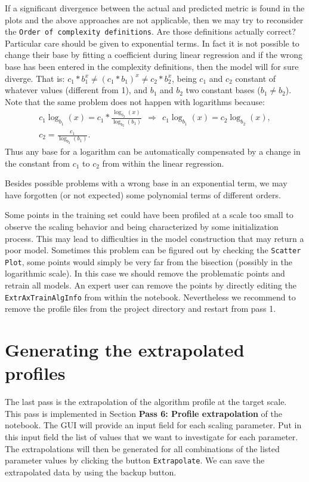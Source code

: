 \documentclass[a4paper, 10pt]{article}
\begin{document}
If a significant divergence between the actual and predicted metric is found in the plots and the above approaches are not applicable,
then we may try to reconsider the \texttt{Order of complexity definitions}. Are those definitions
actually correct? Particular care should be given to
exponential terms. In fact it is not possible to change their base by fitting a coefficient during linear regression and if the wrong base
has been entered in the complexity definitions, then the model will for sure diverge. That is: $c_1*b_1^{x} \neq (c_1*b_1)^{x} \neq c_2*b_2^{x}$, being $c_1$
and $c_2$ constant of whatever values (different from 1), and $b_1$ and $b_2$ two constant bases ($b_1\neq b_2$). Note that the same problem
does not happen with logarithms because:
\begin{eqnarray}
 c_1\log_{b_1}(x) = c_1 * \frac{\log_{b_2}(x)}{\log_{b_2}(b_1)}~~\Rightarrow~~ c_1\log_{b_1}(x) = c_2\log_{b_2}(x), \\
 c_2 = \frac{c_1}{\log_{b_2}(b_1)}.
\end{eqnarray}
Thus any base for a logarithm can be automatically compensated by a change in the constant from $c_1$ to $c_2$ from within the linear regression.

Besides possible problems with a wrong base in an exponential term, we may have forgotten (or not expected)
some polynomial terms of different orders.

Some points in the training set could have been profiled at a scale too small to observe the scaling behavior and being characterized by
some initialization process. This may lead to difficulties in the model construction that may return a poor model.
Sometimes this problem can be figured out by checking the \texttt{Scatter Plot}, some points would simply be very far from the bisection (possibly
in the logarithmic scale). In this case we should remove the problematic points and retrain all models. An expert user can remove
the points by directly editing the \texttt{ExtrAxTrainAlgInfo} from within the \ex notebook. Nevertheless we recommend to remove the profile files
from the \ex project directory and restart from pass 1.

\section{Generating the extrapolated profiles}
\label{sec:output}

The last \ex pass is the extrapolation of the algorithm profile at the target scale. This pass is implemented in Section
\textbf{Pass 6: Profile extrapolation} of the \ex notebook.
The GUI will provide an input field for each scaling parameter. Put in this input field the list of values that we want
to investigate for each parameter. The extrapolations will then be generated for all combinations
of the listed parameter values by clicking the button \texttt{Extrapolate}.
We can save the extrapolated data by using the backup button.
\end{document}
